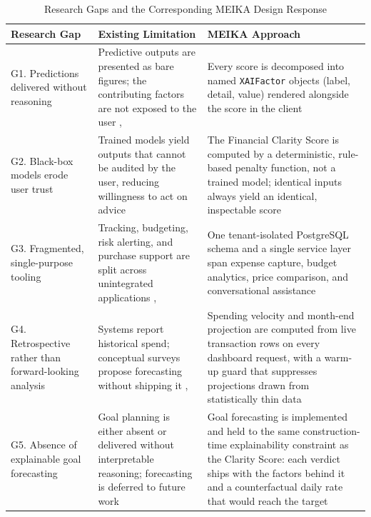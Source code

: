 \documentclass[conference]{IEEEtran}
\begin{document}
\begin{table}[!t]
\centering
\caption{Research Gaps and the Corresponding MEIKA Design Response}
\label{tab:researchgap}
\footnotesize
\renewcommand{\arraystretch}{1.35}
\begin{tabular}{|p{4.2cm}|p{6.3cm}|p{6.6cm}|}
\hline
\textbf{Research Gap} & \textbf{Existing Limitation} & \textbf{MEIKA Approach} \\
\hline
G1. Predictions delivered without reasoning & Predictive outputs are presented as bare figures; the contributing factors are not exposed to the user \cite{kakulapati2026expensetracker}, \cite{deepthi2026aipowered} & Every score is decomposed into named \texttt{XAIFactor} objects (label, detail, value) rendered alongside the score in the client \\
\hline
G2. Black-box models erode user trust & Trained models yield outputs that cannot be audited by the user, reducing willingness to act on advice \cite{saini2025aipowered} & The Financial Clarity Score is computed by a deterministic, rule-based penalty function, not a trained model; identical inputs always yield an identical, inspectable score \\
\hline
G3. Fragmented, single-purpose tooling & Tracking, budgeting, risk alerting, and purchase support are split across unintegrated applications \cite{ganta2025multimodule}, \cite{unde2026dashboard} & One tenant-isolated PostgreSQL schema and a single service layer span expense capture, budget analytics, price comparison, and conversational assistance \\
\hline
G4. Retrospective rather than forward-looking analysis & Systems report historical spend; conceptual surveys propose forecasting without shipping it \cite{nie2024survey}, \cite{khan2025bridging} & Spending velocity and month-end projection are computed from live transaction rows on every dashboard request, with a warm-up guard that suppresses projections drawn from statistically thin data \\
\hline
G5. Absence of explainable goal forecasting & Goal planning is either absent or delivered without interpretable reasoning; forecasting is deferred to future work \cite{patil2026nexus} & Goal forecasting is implemented and held to the same construction-time explainability constraint as the Clarity Score: each verdict ships with the factors behind it and a counterfactual daily rate that would reach the target \\
\hline
\end{tabular}
\end{table}
\end{document}
